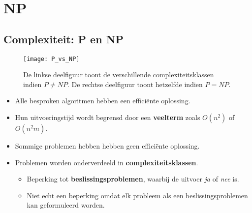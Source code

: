\chapter{NP}

\section{Complexiteit: P en NP}
\begin{figure}[ht]
    \centering
    \texttt{[image: P\_vs\_NP]}
    \caption{De linkse deelfiguur toont de verschillende complexiteitsklassen indien $P \neq NP$. De rechtse deelfiguur toont hetzelfde indien $P = NP$.}
    \label{fig:P_vs_NP}
\end{figure}

\begin{itemize}
    \item Alle besproken algoritmen hebben een efficiënte oplossing. 
    \item Hun uitvoeringstijd wordt begrensd door een \textbf{veelterm} zoals $O(n^2)$ of $O(n^2m)$.
    \item Sommige problemen hebben hebben geen efficiënte oplossing.
    \item Problemen worden onderverdeeld in \textbf{complexiteitsklassen}.
    \begin{itemize}
        \item Beperking tot  \textbf{beslissingsproblemen}, waarbij de uitvoer \textit{ja} of \textit{nee} is.
        \item Niet echt een beperking omdat elk probleem als een beslissingsproblemen kan geformuleerd worden.
    \end{itemize}
\end{itemize}

